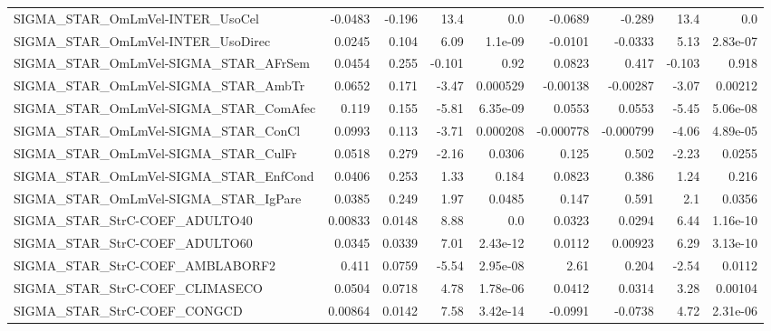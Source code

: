 \begin{tabular}{lrrrrrrrr}
SIGMA\_STAR\_OmLmVel-INTER\_UsoCel        &     -0.0483 &       -0.196 &    13.4 &      0.0 &    -0.0689 &      -0.289 &         13.4 &           0.0 \\
SIGMA\_STAR\_OmLmVel-INTER\_UsoDirec      &      0.0245 &        0.104 &    6.09 &  1.1e-09 &    -0.0101 &     -0.0333 &         5.13 &      2.83e-07 \\
SIGMA\_STAR\_OmLmVel-SIGMA\_STAR\_AFrSem   &      0.0454 &        0.255 &  -0.101 &     0.92 &     0.0823 &       0.417 &       -0.103 &         0.918 \\
SIGMA\_STAR\_OmLmVel-SIGMA\_STAR\_AmbTr    &      0.0652 &        0.171 &   -3.47 & 0.000529 &   -0.00138 &    -0.00287 &        -3.07 &       0.00212 \\
SIGMA\_STAR\_OmLmVel-SIGMA\_STAR\_ComAfec  &       0.119 &        0.155 &   -5.81 & 6.35e-09 &     0.0553 &      0.0553 &        -5.45 &      5.06e-08 \\
SIGMA\_STAR\_OmLmVel-SIGMA\_STAR\_ConCl    &      0.0993 &        0.113 &   -3.71 & 0.000208 &  -0.000778 &   -0.000799 &        -4.06 &      4.89e-05 \\
SIGMA\_STAR\_OmLmVel-SIGMA\_STAR\_CulFr    &      0.0518 &        0.279 &   -2.16 &   0.0306 &      0.125 &       0.502 &        -2.23 &        0.0255 \\
SIGMA\_STAR\_OmLmVel-SIGMA\_STAR\_EnfCond  &      0.0406 &        0.253 &    1.33 &    0.184 &     0.0823 &       0.386 &         1.24 &         0.216 \\
SIGMA\_STAR\_OmLmVel-SIGMA\_STAR\_IgPare   &      0.0385 &        0.249 &    1.97 &   0.0485 &      0.147 &       0.591 &          2.1 &        0.0356 \\
SIGMA\_STAR\_StrC-COEF\_ADULTO40          &     0.00833 &       0.0148 &    8.88 &      0.0 &     0.0323 &      0.0294 &         6.44 &      1.16e-10 \\
SIGMA\_STAR\_StrC-COEF\_ADULTO60          &      0.0345 &       0.0339 &    7.01 & 2.43e-12 &     0.0112 &     0.00923 &         6.29 &      3.13e-10 \\
SIGMA\_STAR\_StrC-COEF\_AMBLABORF2        &       0.411 &       0.0759 &   -5.54 & 2.95e-08 &       2.61 &       0.204 &        -2.54 &        0.0112 \\
SIGMA\_STAR\_StrC-COEF\_CLIMASECO         &      0.0504 &       0.0718 &    4.78 & 1.78e-06 &     0.0412 &      0.0314 &         3.28 &       0.00104 \\
SIGMA\_STAR\_StrC-COEF\_CONGCD            &     0.00864 &       0.0142 &    7.58 & 3.42e-14 &    -0.0991 &     -0.0738 &         4.72 &      2.31e-06 \\

\end{tabular}
